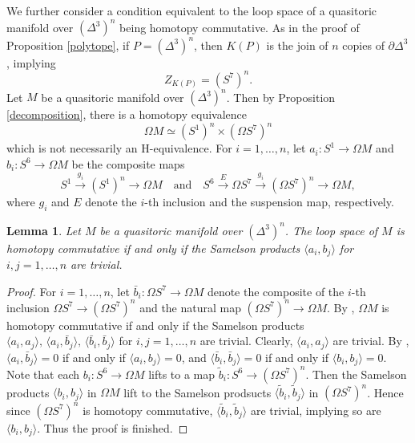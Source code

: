 \documentclass[a4paper]{amsart}
\numberwithin{equation}{section}
\newtheorem{lemma}[theorem]{Lemma}
\theoremstyle{definition}
\theoremstyle{remark}
\numberwithin{equation}{section}
\begin{document}
We further consider a condition equivalent to the loop space of a quasitoric manifold over $(\Delta^3)^n$ being homotopy commutative. As in the proof of Proposition \ref{polytope}, if $P=(\Delta^3)^n$, then $K(P)$ is the join of $n$ copies of $\partial\Delta^3$, implying
\[
  Z_{K(P)}=(S^7)^n.
\]
Let $M$ be a quasitoric manifold over $(\Delta^3)^n$. Then by Proposition \ref{decomposition}, there is a homotopy equivalence
\[
  \Omega M\simeq(S^1)^n\times(\Omega S^7)^n
\]
which is not necessarily an H-equivalence. For $i=1,\ldots,n$, let $a_i\colon S^1\to\Omega M$ and $b_i\colon S^6\to\Omega M$ be the composite maps
\[
  S^1\xrightarrow{g_i}(S^1)^n\to\Omega M\quad\text{and}\quad S^6\xrightarrow{E}\Omega S^7\xrightarrow{g_i}(\Omega S^7)^n\to\Omega M,
\]
where $g_i$ and $E$ denote the $i$-th inclusion and the suspension map, respectively.



\begin{lemma}
  \label{equivalent condition}
  Let $M$ be a quasitoric manifold over $(\Delta^3)^n$. The loop space of $M$ is homotopy commutative if and only if the Samelson products $\langle a_i,b_j\rangle$ for $i,j=1,\ldots,n$ are trivial.
\end{lemma}

\begin{proof}
  For $i=1,\ldots,n$, let $\bar{b}_i\colon\Omega S^7\to\Omega M$ denote the composite of the $i$-th inclusion $\Omega S^7\to(\Omega S^7)^n$ and the natural map $(\Omega S^7)^n\to\Omega M$. By \cite[Proposition 1]{KK}, $\Omega M$ is homotopy commutative if and only if the Samelson products $\langle a_i,a_j\rangle,\,\langle a_i,\bar{b}_j\rangle,\,\langle\bar{b}_i,\bar{b}_j\rangle$ for $i,j=1,\ldots,n$ are trivial. Clearly, $\langle a_i,a_j\rangle$ are trivial. By \cite[Lemma 2.1]{G}, $\langle a_i,\bar{b}_j\rangle=0$ if and only if $\langle a_i,b_j\rangle=0$, and $\langle\bar{b}_i,\bar{b}_j\rangle=0$ if and only if $\langle b_i,b_j\rangle=0$. Note that each $b_i\colon S^6\to\Omega M$ lifts to a map $\tilde{b}_i\colon S^6\to(\Omega S^7)^n$. Then the Samelson products $\langle b_i,b_j\rangle$ in $\Omega M$ lift to the Samelson prodsucts $\langle\tilde{b}_i,\tilde{b}_j\rangle$ in $(\Omega S^7)^n$. Hence since $(\Omega S^7)^n$ is homotopy commutative, $\langle\tilde{b}_i,\tilde{b}_j\rangle$ are trivial, implying so are $\langle b_i,b_j\rangle$. Thus the proof is finished.
\end{proof}



\end{document}
